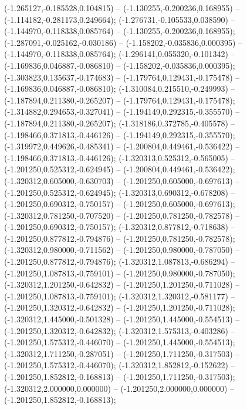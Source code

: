  (-1.265127,-0.185528,0.104815) -- (-1.130255,-0.200236,0.168955) -- (-1.114182,-0.281173,0.249664);
 (-1.276731,-0.105533,0.038590) -- (-1.144970,-0.118338,0.085764) -- (-1.130255,-0.200236,0.168955);
 (-1.287091,-0.025162,-0.030186) -- (-1.158202,-0.035836,0.000395) -- (-1.144970,-0.118338,0.085764);
 (-1.296141,0.055320,-0.101342) -- (-1.169836,0.046887,-0.086810) -- (-1.158202,-0.035836,0.000395);
 (-1.303823,0.135637,-0.174683) -- (-1.179764,0.129431,-0.175478) -- (-1.169836,0.046887,-0.086810);
 (-1.310084,0.215510,-0.249993) -- (-1.187894,0.211380,-0.265207) -- (-1.179764,0.129431,-0.175478);
 (-1.314882,0.294653,-0.327041) -- (-1.194149,0.292315,-0.355570) -- (-1.187894,0.211380,-0.265207);
 (-1.318186,0.372785,-0.405578) -- (-1.198466,0.371813,-0.446126) -- (-1.194149,0.292315,-0.355570);
 (-1.319972,0.449626,-0.485341) -- (-1.200804,0.449461,-0.536422) -- (-1.198466,0.371813,-0.446126);
 (-1.320313,0.525312,-0.565005) -- (-1.201250,0.525312,-0.624945) -- (-1.200804,0.449461,-0.536422);
 (-1.320312,0.605000,-0.630703) -- (-1.201250,0.605000,-0.697613) -- (-1.201250,0.525312,-0.624945);
 (-1.320313,0.690312,-0.678208) -- (-1.201250,0.690312,-0.750157) -- (-1.201250,0.605000,-0.697613);
 (-1.320312,0.781250,-0.707520) -- (-1.201250,0.781250,-0.782578) -- (-1.201250,0.690312,-0.750157);
 (-1.320312,0.877812,-0.718638) -- (-1.201250,0.877812,-0.794876) -- (-1.201250,0.781250,-0.782578);
 (-1.320312,0.980000,-0.711562) -- (-1.201250,0.980000,-0.787050) -- (-1.201250,0.877812,-0.794876);
 (-1.320312,1.087813,-0.686294) -- (-1.201250,1.087813,-0.759101) -- (-1.201250,0.980000,-0.787050);
 (-1.320312,1.201250,-0.642832) -- (-1.201250,1.201250,-0.711028) -- (-1.201250,1.087813,-0.759101);
 (-1.320312,1.320312,-0.581177) -- (-1.201250,1.320312,-0.642832) -- (-1.201250,1.201250,-0.711028);
 (-1.320312,1.445000,-0.501328) -- (-1.201250,1.445000,-0.554513) -- (-1.201250,1.320312,-0.642832);
 (-1.320312,1.575313,-0.403286) -- (-1.201250,1.575312,-0.446070) -- (-1.201250,1.445000,-0.554513);
 (-1.320312,1.711250,-0.287051) -- (-1.201250,1.711250,-0.317503) -- (-1.201250,1.575312,-0.446070);
 (-1.320312,1.852812,-0.152622) -- (-1.201250,1.852812,-0.168813) -- (-1.201250,1.711250,-0.317503);
 (-1.320312,2.000000,0.000000) -- (-1.201250,2.000000,0.000000) -- (-1.201250,1.852812,-0.168813);
